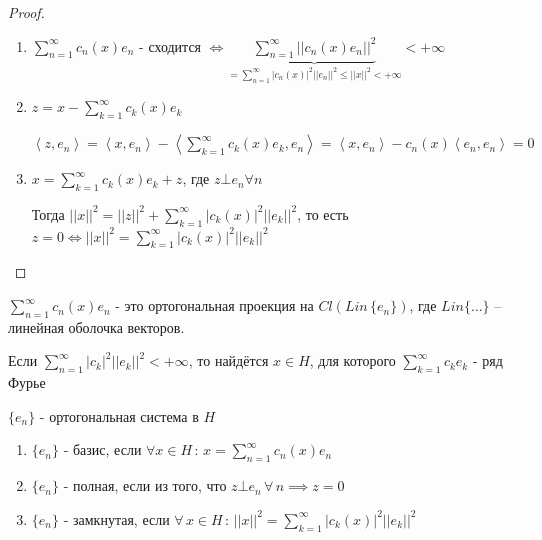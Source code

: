 \begin{proof}
    \begin{enumerate}
        \item {
            $\sum_{n = 1}^\infty c_n (x) e_n$ - сходится $\Longleftrightarrow \underbrace{\sum_{n = 1}^\infty ||c_n (x) e_n||^2}_{= \sum_{n = 1}^\infty |c_n (x)|^2 ||e_n||^2 \leqslant ||x||^2 < +\infty} < +\infty$
        }
        \item {
            $z = x - \sum_{k = 1}^\infty c_k(x)e_k$

            $\left < z, e_n \right > = \left < x, e_n \right > - \left < \sum_{k = 1}^\infty c_k (x) e_k, e_n \right > = \left < x, e_n \right > - c_n(x) \left < e_n, e_n \right > = 0$
        }
        \item {
            $x = \sum_{k = 1}^\infty c_k (x) e_k + z$, где $z \bot e_n \forall n$

            Тогда $||x||^2 = ||z||^2 + \sum_{k = 1}^\infty |c_k (x)|^2 ||e_k||^2$, то есть $z = 0 \Longleftrightarrow ||x||^2 = \sum_{k = 1}^\infty |c_k(x)|^2 ||e_k||^2$
        }
    \end{enumerate}
\end{proof}

\begin{remark}
    $\sum_{n = 1}^\infty c_n (x) e_n$ - это ортогональная проекция на $Cl \left( Lin \, \{ e_n \} \right)$, где $Lin \{ \ldots \}$ -- линейная оболочка векторов.
\end{remark}

\begin{remark}
    Если $\sum_{n = 1}^\infty |c_k|^2 ||e_k||^2 < +\infty$, то найдётся $x \in H$, для которого $\sum_{k = 1}^\infty c_k e_k$ - ряд Фурье
\end{remark}

\begin{definition}
    $\{ e_n \}$ - ортогональная система в $H$

    \begin{enumerate}
        \item {
            $\{ e_n \}$ - базис, если $\forall x \in H \, : \, x = \sum_{n = 1}^\infty c_n (x) e_n$
        }
        \item {
            $\{ e_n \}$ - полная, если из того, что $z \bot e_n \, \forall \, n \implies z = 0$
        }
        \item {
            $\{ e_n \}$ - замкнутая, если $\forall \, x \in H \, : \, ||x||^2 = \sum_{k = 1}^\infty |c_k (x)|^2 ||e_k||^2$

        }
    \end{enumerate}
\end{definition}

